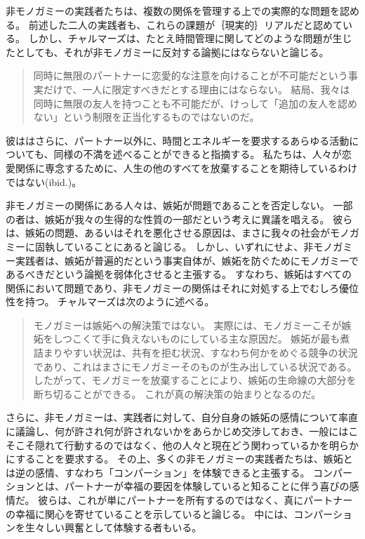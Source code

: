 \documentclass[paper=a4,book,openany]{jlreq}
\begin{document}
非モノガミーの実践者たちは、複数の関係を管理する上での実際的な問題を認める。
前述した二人の実践者も、これらの課題が｛現実的｝{リアル}だと認めている。
しかし、チャルマーズは、たとえ時間管理に関してどのような問題が生じたとしても、それが非モノガミーに反対する論拠にはならないと論じる。

\begin{quote}
同時に無限のパートナーに恋愛的な注意を向けることが不可能だという事実だけで、一人に限定すべきだとする理由にはならない。
結局、我々は同時に無限の友人を持つことも不可能だが、けっして「追加の友人を認めない」という制限を正当化するものではないのだ。
\citep[p.232]{chalmers19:_is_monog_moral_permis}

\end{quote}

彼ははさらに、パートナー以外に、時間とエネルギーを要求するあらゆる活動についても、同様の不満を述べることができると指摘する。
私たちは、人々が恋愛関係に専念するために、人生の他のすべてを放棄することを期待しているわけではない(ibid.)。

非モノガミーの関係にある人々は、嫉妬が問題であることを否定しない。
一部の者は、嫉妬が我々の生得的な性質の一部だという考えに異議を唱える。
彼らは、嫉妬の問題、あるいはそれを悪化させる原因は、まさに我々の社会がモノガミーに固執していることにあると論じる。
しかし、いずれにせよ、非モノガミー実践者は、嫉妬が普遍的だという事実自体が、嫉妬を防ぐためにモノガミーであるべきだという論拠を弱体化させると主張する。
すなわち、嫉妬はすべての関係において問題であり、非モノガミーの関係はそれに対処する上でむしろ優位性を持つ。
チャルマーズは次のように述べる。

\begin{quote}
モノガミーは嫉妬への解決策ではない。
実際には、モノガミーこそが嫉妬をしつこくて手に負えないものにしている主な原因だ。
嫉妬が最も煮詰まりやすい状況は、共有を拒む状況、すなわち何かをめぐる競争の状況であり、これはまさにモノガミーそのものが生み出している状況である。
したがって、モノガミーを放棄することにより、嫉妬の生命線の大部分を断ち切ることができる。
これが真の解決策の始まりとなるのだ。
\citep[p.237]{chalmers19:_is_monog_moral_permis}
\end{quote}

さらに、非モノガミーは、実践者に対して、自分自身の嫉妬の感情について率直に議論し、何が許され何が許されないかをあらかじめ交渉しておき、一般にはこそこそ隠れて行動するのではなく、他の人々と現在どう関わっているかを明らかにすることを要求する。
その上、多くの非モノガミーの実践者たちは、嫉妬とは逆の感情、すなわち「コンパーション」を体験できると主張する。
コンパーションとは、パートナーが幸福の要因を体験していると知ることに伴う喜びの感情だ。
彼らは、これが単にパートナーを所有するのではなく、真にパートナーの幸福に関心を寄せていることを示していると論じる。
中には、コンパーションを生々しい興奮として体験する者もいる\citep{sousa18:_love_jealous_comper}。
\end{document}
